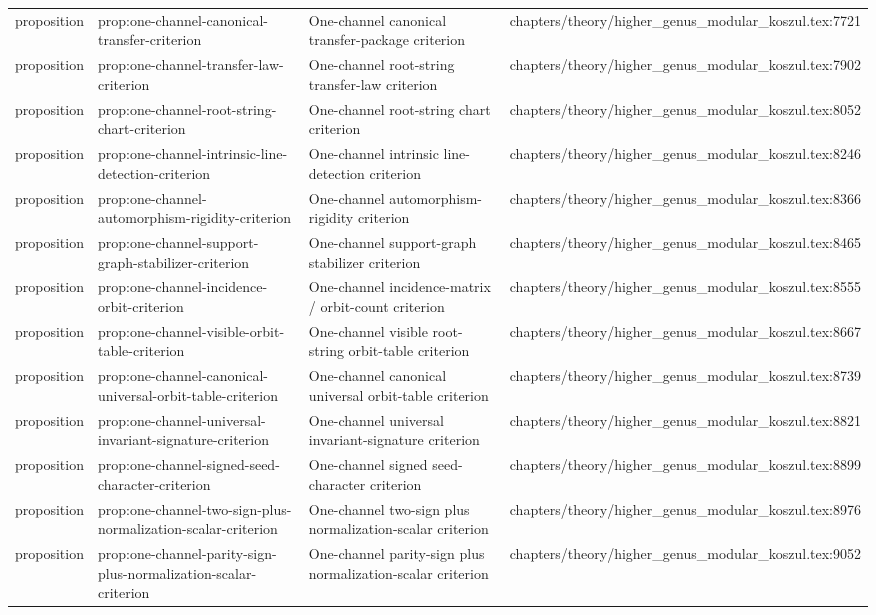 \documentclass[11pt]{article}
\begin{document}
\begin{longtable}{L{0.10\textwidth}L{0.26\textwidth}L{0.42\textwidth}L{0.22\textwidth}}
proposition & prop:one-channel-canonical-transfer-criterion & One-channel canonical transfer-package criterion & chapters/theory/higher\_genus\_modular\_koszul.tex:7721\\
proposition & prop:one-channel-transfer-law-criterion & One-channel root-string transfer-law criterion & chapters/theory/higher\_genus\_modular\_koszul.tex:7902\\
proposition & prop:one-channel-root-string-chart-criterion & One-channel root-string chart criterion & chapters/theory/higher\_genus\_modular\_koszul.tex:8052\\
proposition & prop:one-channel-intrinsic-line-detection-criterion & One-channel intrinsic line-detection criterion & chapters/theory/higher\_genus\_modular\_koszul.tex:8246\\
proposition & prop:one-channel-automorphism-rigidity-criterion & One-channel automorphism-rigidity criterion & chapters/theory/higher\_genus\_modular\_koszul.tex:8366\\
proposition & prop:one-channel-support-graph-stabilizer-criterion & One-channel support-graph stabilizer criterion & chapters/theory/higher\_genus\_modular\_koszul.tex:8465\\
proposition & prop:one-channel-incidence-orbit-criterion & One-channel incidence-matrix / orbit-count criterion & chapters/theory/higher\_genus\_modular\_koszul.tex:8555\\
proposition & prop:one-channel-visible-orbit-table-criterion & One-channel visible root-string orbit-table criterion & chapters/theory/higher\_genus\_modular\_koszul.tex:8667\\
proposition & prop:one-channel-canonical-universal-orbit-table-criterion & One-channel canonical universal orbit-table criterion & chapters/theory/higher\_genus\_modular\_koszul.tex:8739\\
proposition & prop:one-channel-universal-invariant-signature-criterion & One-channel universal invariant-signature criterion & chapters/theory/higher\_genus\_modular\_koszul.tex:8821\\
proposition & prop:one-channel-signed-seed-character-criterion & One-channel signed seed-character criterion & chapters/theory/higher\_genus\_modular\_koszul.tex:8899\\
proposition & prop:one-channel-two-sign-plus-normalization-scalar-criterion & One-channel two-sign plus normalization-scalar criterion & chapters/theory/higher\_genus\_modular\_koszul.tex:8976\\
proposition & prop:one-channel-parity-sign-plus-normalization-scalar-criterion & One-channel parity-sign plus normalization-scalar criterion & chapters/theory/higher\_genus\_modular\_koszul.tex:9052\\

\end{longtable}
\end{document}
